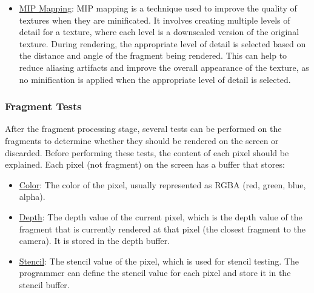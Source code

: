 \begin{itemize}
\begin{itemize}
        The values of $\alpha,\beta\in [0, 1]$ are calculated based on the position of the fragment relative to the texels.
        \begin{equation*}
            \alpha = \frac{x - x_i}{x_{i+1} - x_i}, \quad \beta = \frac{y - y_j}{y_{j+1} - y_j}
        \end{equation*}
    \end{itemize}

    \item \ul{MIP Mapping}: MIP mapping is a technique used to improve the quality of textures when they are minificated. It involves creating multiple levels of detail for a texture, where each level is a downscaled version of the original texture. During rendering, the appropriate level of detail is selected based on the distance and angle of the fragment being rendered. This can help to reduce aliasing artifacts and improve the overall appearance of the texture, as no minification is applied when the appropriate level of detail is selected.
\end{itemize}


\subsubsection{Fragment Tests}

After the fragment processing stage, several tests can be performed on the fragments to determine whether they should be rendered on the screen or discarded. Before performing these tests, the content of each pixel should be explained. Each pixel (not fragment) on the screen has a buffer that stores:
\begin{itemize}
    \item \ul{Color}: The color of the pixel, usually represented as RGBA (red, green, blue, alpha).
    \item \ul{Depth}: The depth value of the current pixel, which is the depth value of the fragment that is currently rendered at that pixel (the closest fragment to the camera). It is stored in the depth buffer.
    \item \ul{Stencil}: The stencil value of the pixel, which is used for stencil testing. The programmer can define the stencil value for each pixel and store it in the stencil buffer.
\end{itemize}


